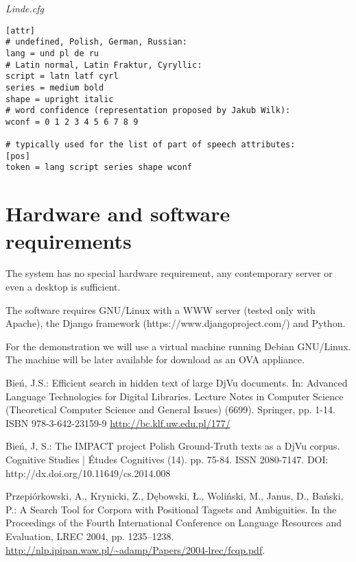 \documentclass[runningheads,a4paper]{llncs}
\begin{document}
\medskip

\noindent
{\it Linde.cfg}
\begin{verbatim}
[attr]
# undefined, Polish, German, Russian:
lang = und pl de ru
# Latin normal, Latin Fraktur, Cyryllic:
script = latn latf cyrl
series = medium bold
shape = upright italic
# word confidence (representation proposed by Jakub Wilk):
wconf = 0 1 2 3 4 5 6 7 8 9

# typically used for the list of part of speech attributes:
[pos]
token = lang script series shape wconf
\end{verbatim}
%


\section{Hardware and software requirements}
\label{sec:hardw-softw-requ}

The system has no special hardware requirement, any contemporary
server or even a desktop is sufficient.

The software requires GNU/Linux with a WWW server (tested only with
Apache), the Django framework (https://www.djangoproject.com/) and
Python.

For the demonstration we will use a virtual machine running Debian
GNU/Linux. The machine will be later available for download as an OVA
appliance.


\begin{thebibliography}{4}

 Bień, J.S.: Efficient search in hidden text of
  large DjVu documents. In: Advanced Language Technologies for Digital
  Libraries. Lecture Notes in Computer Science (Theoretical Computer
  Science and General Issues) (6699). Springer, pp. 1-14. ISBN
  978-3-642-23159-9 \url{http://bc.klf.uw.edu.pl/177/}

 Bień, J, S.: The IMPACT project Polish Ground-Truth texts as
a DjVu corpus. Cognitive Studies | Études Cognitives
(14). pp. 75-84. ISSN 2080-7147.
DOI: http://dx.doi.org/10.11649/cs.2014.008


 Przepiórkowski, A., Krynicki, Z., Dębowski, Ł.,
  Woliński, M., Janus, D., Bański, P.: A Search Tool for Corpora with
  Positional Tagsets and Ambiguities. In the Proceedings of the Fourth
  International Conference on Language Resources and Evaluation, LREC
  2004,
  pp. 1235--1238. \url{http://nlp.ipipan.waw.pl/~adamp/Papers/2004-lrec/fcqp.pdf}.


\end{thebibliography}
\end{document}
